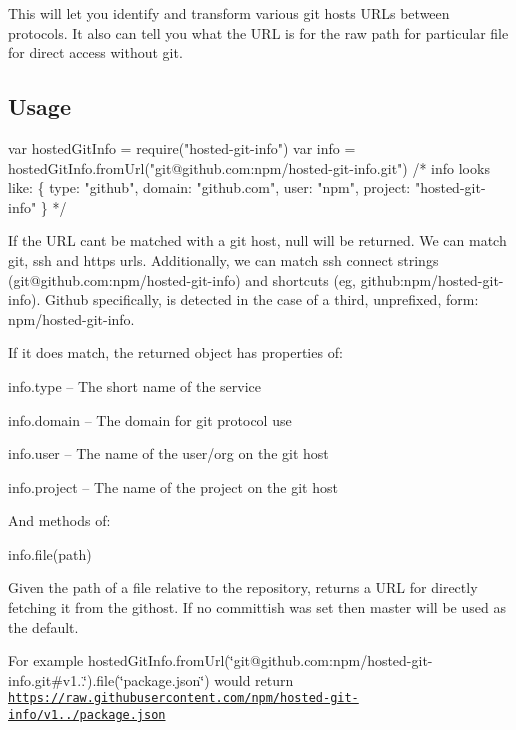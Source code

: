 This will let you identify and transform various git hosts U\+R\+Ls between protocols. It also can tell you what the U\+RL is for the raw path for particular file for direct access without git.

\subsection*{Usage}


\begin{DoxyCode}
var hostedGitInfo = require("hosted-git-info")
var info = hostedGitInfo.fromUrl("git@github.com:npm/hosted-git-info.git")
/* info looks like:
\{
  type: "github",
  domain: "github.com",
  user: "npm",
  project: "hosted-git-info"
\}
*/
\end{DoxyCode}


If the U\+RL can\textquotesingle{}t be matched with a git host, {\ttfamily null} will be returned. We can match git, ssh and https urls. Additionally, we can match ssh connect strings ({\ttfamily git@github.\+com\+:npm/hosted-\/git-\/info}) and shortcuts (eg, {\ttfamily github\+:npm/hosted-\/git-\/info}). Github specifically, is detected in the case of a third, unprefixed, form\+: {\ttfamily npm/hosted-\/git-\/info}.

If it does match, the returned object has properties of\+:


\begin{DoxyItemize}
\item info.\+type -- The short name of the service
\item info.\+domain -- The domain for git protocol use
\item info.\+user -- The name of the user/org on the git host
\item info.\+project -- The name of the project on the git host
\end{DoxyItemize}

And methods of\+:


\begin{DoxyItemize}
\item info.\+file(path)
\end{DoxyItemize}

Given the path of a file relative to the repository, returns a U\+RL for directly fetching it from the githost. If no committish was set then {\ttfamily master} will be used as the default.

For example {\ttfamily hosted\+Git\+Info.\+from\+Url(\char`\"{}git@github.\+com\+:npm/hosted-\/git-\/info.\+git\#v1..\char`\"{}).file(\char`\"{}package.\+json\char`\"{})} would return {\ttfamily \href{https://raw.githubusercontent.com/npm/hosted-git-info/v1.0.0/package.json}{\tt https\+://raw.\+githubusercontent.\+com/npm/hosted-\/git-\/info/v1../package.\+json}}


